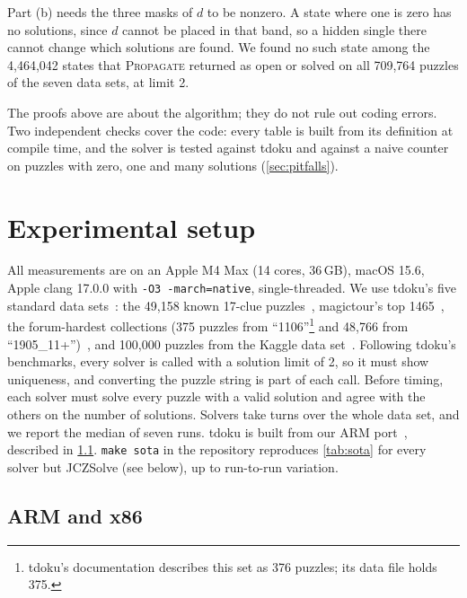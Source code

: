 \documentclass[11pt]{article}
\theoremstyle{definition}
\theoremstyle{plain}
\let\origtextsc\textsc
\renewcommand{\textsc}[1]{\textup{\origtextsc{#1}}}
\begin{document}
\noindent Part (b) needs the three masks of $d$ to be nonzero. A state where one is zero has no solutions, since $d$
cannot be placed in that band, so a hidden single there cannot change which solutions are found. We found no such
state among the 4{,}464{,}042 states that \textsc{Propagate} returned as open or solved on all 709{,}764 puzzles of the
seven data sets, at limit 2.

The proofs above are about the algorithm; they do not rule out coding errors. Two independent checks cover the code:
every table is built from its definition at compile time, and the solver is tested against tdoku and against a naive
counter on puzzles with zero, one and many solutions (\cref{sec:pitfalls}).

\section{Experimental setup}
\label{sec:setup}

All measurements are on an Apple M4 Max (14 cores, 36\,GB), macOS 15.6, Apple clang 17.0.0 with \texttt{-O3
-march=native}, single-threaded. We use tdoku's five standard data sets~\cite{dillon2019nerdsniped}: the 49{,}158
known 17-clue puzzles~\cite{royle17clue,champagne2022all17}, magictour's top 1465~\cite{stertenbrink2005top1465}, the forum-hardest collections (375
puzzles from ``1106''\footnote{tdoku's documentation describes this set as 376 puzzles; its data file holds 375.} and
48{,}766 from ``1905\_11+'')~\cite{forumhardest}, and 100{,}000 puzzles from the Kaggle
data set~\cite{park2016kaggle}. Following tdoku's benchmarks, every solver is called with a solution limit of 2, so it
must show uniqueness, and converting the puzzle string is part of each call. Before timing, each solver must solve
every puzzle with a valid solution and agree with the others on the number of solutions. Solvers take turns over the
whole data set, and we report the median of seven runs. tdoku is built from our ARM port~\cite{kelly2026tdokuarm}, described in \cref{sec:arm}. \texttt{make sota} in the repository reproduces \cref{tab:sota} for every solver but JCZSolve (see below), up to run-to-run variation.

\subsection{ARM and x86}
\label{sec:arm}
\end{document}
